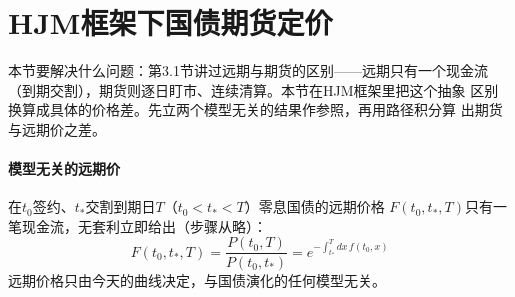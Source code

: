 \section{HJM框架下国债期货定价}

本节要解决什么问题：第3.1节讲过远期与期货的区别——远期只有一个现金流
（到期交割），期货则逐日盯市、连续清算。本节在HJM框架里把这个抽象
区别换算成具体的价格差。先立两个模型无关的结果作参照，再用路径积分算
出期货与远期价之差。

\paragraph{模型无关的远期价}
在$t_0$签约、$t_*$交割到期日$T$（$t_0<t_*<T$）零息国债的远期价格
$F(t_0,t_*,T)$只有一笔现金流，无套利立即给出（步骤从略）：
\begin{equation*}
F(t_0,t_*,T)=\frac{P(t_0,T)}{P(t_0,t_*)}
=e^{-\int_{t_*}^{T}dx\,f(t_0,x)}
\end{equation*}
远期价格只由今天的曲线决定，与国债演化的任何模型无关。

